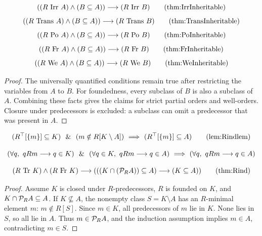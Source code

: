 \begin{theorem}
\[
(
(R\mathrm{\ Irr\ }A)
\land
(B\subclass A)
)
\implies
(R\mathrm{\ Irr\ }B)
\labeltagd{thm}{IrrInheritable}
\]\[
(
(R\mathrm{\ Trans\ }A)
\land
(B\subclass A)
)
\implies
(R\mathrm{\ Trans\ }B)
\labeltagd{thm}{TransInheritable}
\]
\[
(
(R\mathrm{\ Po\ }A)
\land
(B\subclass A)
)
\implies
(R\mathrm{\ Po\ }B)
\labeltagd{thm}{PoInheritable}
\]
\[
(
(R\mathrm{\ Fr\ }A)
\land
(B\subclass A)
)
\implies
(R\mathrm{\ Fr\ }B)
\labeltagd{thm}{FrInheritable}
\]
\[
(
(R\mathrm{\ We\ }A)
\land
(B\subclass A)
)
\implies
(R\mathrm{\ We\ }B)
\labeltagd{thm}{WeInheritable}
\]
\end{theorem}
\begin{proof}
The universally quantified conditions remain true after restricting the
variables from $A$ to $B$. For foundedness, every subclass of $B$ is also
a subclass of $A$. Combining these facts gives the claims for strict
partial orders and well-orders. Closure under predecessors is excluded:
a subclass can omit a predecessor that was present in $A$.
\end{proof}
\begin{lemma}
\[
(R^\top[\{m\}]\subclass K)
\LAND
(m\notin R[K\setminus A])
\IMPLIES
(R^\top[\{m\}]\subclass A)
\labeltagd{lem}{Rindlem}
\]
\end{lemma}
\ProofNoPar
\[
(\forall q,\ qRm\longrightarrow q\in K)
\ \ \&\ \ 
(\forall q\in K,\ qRm\longrightarrow q\in A)
\ \Longrightarrow\ 
(\forall q,\ qRm\longrightarrow q\in A)
\]
\Done
\pagebreak
\begin{theorem}
\[
(R\ \Tr\ K)
\land
(R\mathrm{\ Fr\ }K)
\implies
(
((K\cap(\power_R A))\subclass A)
\implies
(K\subclass A)
)
\labeltagd{thm}{Rind}
\]
\end{theorem}
\begin{proof}
Assume $K$ is closed under $R$-predecessors, $R$ is founded on $K$, and
$K\cap\mathcal{P}_R A\subseteq A$. If $K\nsubseteq A$, the nonempty class
$S=K\setminus A$ has an $R$-minimal element $m$: $m\notin R[S]$.
Since $m\in K$, all predecessors of $m$ lie in $K$. None lies in $S$,
so all lie in $A$. Thus $m\in\mathcal{P}_R A$, and the induction assumption
implies $m\in A$, contradicting $m\in S$.
\end{proof} %

